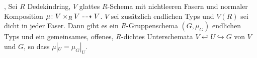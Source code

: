\documentclass[german]{scrreprt}
\begin{document}
\begin{Satz}\label{thm:weil}
  \cite[Theorem VIII.1.12]{artin},
  \cite[Theorem IV.6.9]{silverman2}
  Sei $R$ Dedekindring, $V$ glattes $R$-Schema mit nichtleeren Fasern
  und normaler Komposition $\mu\colon V\times_R V\dashrightarrow V$.
  $V$ sei zusätzlich endlichen Typs und $V(R)$ sei dicht in jeder
  Faser. 
  Dann gibt es ein $R$-Gruppenschema $(G,\mu_G)$ endlichen Typs und
  ein gemeinsames, offenes, $R$-dichtes Unterschemata $V\hookleftarrow
  U\hookrightarrow G$ von $V$ und $G$, so dass $\mu|_U=\mu_G|_U$.
\end{Satz}
\end{document}
